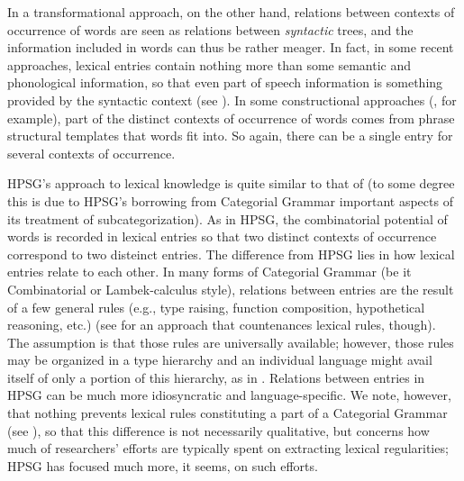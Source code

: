 \documentclass[output=paper]{langsci/langscibook}
\begin{document}
In a transformational approach, on the other hand, relations between contexts of occurrence of words are seen as relations between \emph{syntactic} trees, and the information included in words can thus be rather meager. In fact, in some recent approaches, lexical entries contain nothing more than some semantic and phonological information, so that even part of speech information is something provided by the syntactic context (see \citealt{Borer2003,Marantz1997}). In some constructional approaches  (\citet{Goldberg1995}, for example), part of the distinct contexts of occurrence of words comes from phrase structural templates that words fit into. So again, there can be a single entry for several contexts of occurrence.

HPSG's approach to lexical knowledge is quite similar to that of  (to some degree this is due to HPSG's borrowing from Categorial Grammar important aspects of its treatment of subcategorization). As in HPSG, the combinatorial potential of words is recorded in lexical entries so that two distinct contexts of occurrence correspond to two disteinct entries. The difference from HPSG lies in how lexical entries relate to each other. In many forms of Categorial Grammar (be it Combinatorial or Lambek-calculus style), relations between entries are the result of a few general rules (e.g., type raising, function composition, hypothetical reasoning, etc.) (see \citet{Dowty1978} for an approach that countenances lexical rules, though).
The assumption is that those rules are universally available; however, those rules may be organized in a type hierarchy and an individual language might avail itself of only a portion of this hierarchy, as in \citep{Baldridge2002}. Relations between entries in HPSG can be much more idiosyncratic and language-specific. We note, however, that nothing prevents lexical rules constituting a part of a Categorial Grammar (see \citealt{Carpenter1992b}), so that this difference is not necessarily qualitative, but concerns how much of researchers' efforts are typically spent on extracting lexical regularities; HPSG has focused much more, it seems, on such efforts.
\end{document}
